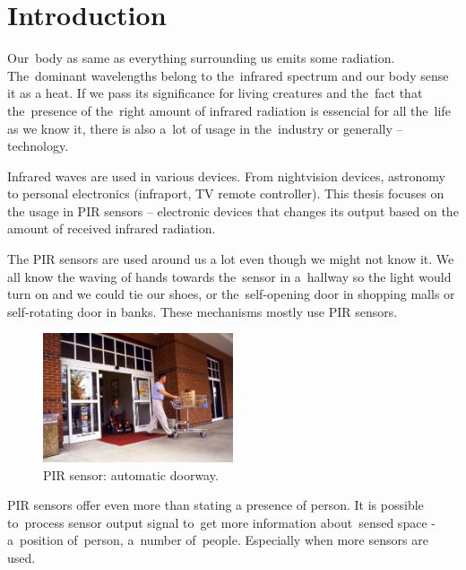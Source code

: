
\chapter{Introduction}
\label{chapter:introduction}


Our~body as same as everything surrounding us emits some radiation. The~dominant wavelengths
belong to the~infrared spectrum and our body sense it as a heat. If we pass its significance
for living creatures and the~fact that the~presence of the~right amount of infrared radiation
is essencial for all the~life as we know it, there is also a~lot of usage in the~industry or
generally -- technology.

Infrared waves are used in various devices. From nightvision devices, astronomy to personal
electronics (infraport, TV remote controller). This thesis focuses on the usage in PIR
sensors -- electronic devices that changes its output based on the amount of received infrared
radiation.

The PIR sensors are used around us a lot even though we might not know it. We all know the waving
of hands towards the~sensor in a~hallway so the light would turn on and we could tie our shoes,
or the~self-opening door in shopping malls or self-rotating door in banks. These mechanisms mostly
use PIR sensors.

\begin{figure}[h!]
  \begin{center}
    \includegraphics[width=0.5\textwidth]{obrazky-figures/automaticdoorway.jpg}
    \caption{PIR sensor: automatic doorway. \cite{automaticdoorway} \label{fig:automaticdoorway}}
  \end{center}
\end{figure}

PIR sensors offer even more than stating a presence of person. It is possible to~process sensor
output signal to~get more information about~sensed space - a~position of~person, a~number of~people.
Especially when more sensors are used.

